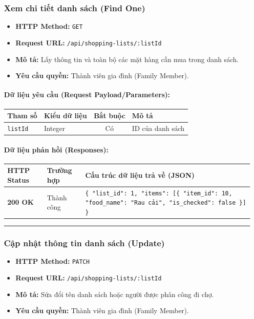\documentclass[12pt,a4paper]{article}
\begin{document}
\subsubsection{Xem chi tiết danh sách (Find One)}
\begin{itemize}[leftmargin=*]
    \item \textbf{HTTP Method:} \texttt{GET}
    \item \textbf{Request URL:} \texttt{/api/shopping-lists/:listId}
    \item \textbf{Mô tả:} Lấy thông tin và toàn bộ các mặt hàng cần mua trong danh sách.
    \item \textbf{Yêu cầu quyền:} Thành viên gia đình (Family Member).
\end{itemize}

\paragraph{Dữ liệu yêu cầu (Request Payload/Parameters):}
\begin{longtable}{|>{\raggedright\arraybackslash}p{2.8cm}|>{\raggedright\arraybackslash}p{2.2cm}|c|>{\raggedright\arraybackslash}p{7.0cm}|}
\hline
\textbf{Tham số} & \textbf{Kiểu dữ liệu} & \textbf{Bắt buộc} & \textbf{Mô tả} \\ \hline
\endhead
\texttt{listId} & Integer & Có & ID của danh sách \\ \hline
\end{longtable}

\paragraph{Dữ liệu phản hồi (Responses):}
\begin{longtable}{|>{\raggedright\arraybackslash}p{2.8cm}|>{\raggedright\arraybackslash}p{3.2cm}|>{\raggedright\arraybackslash}p{8.0cm}|}
\hline
\textbf{HTTP Status} & \textbf{Trường hợp} & \textbf{Cấu trúc dữ liệu trả về (JSON)} \\ \hline
\endhead
\textbf{200 OK} & Thành công & \texttt{\{ "list\_id": 1, "items": [\{ "item\_id": 10, "food\_name": "Rau cải", "is\_checked": false \}] \}} \\ \hline
\end{longtable}

\vskip 0.4cm
\noindent\rule{\textwidth}{0.3pt}
\vskip 0.4cm

\subsubsection{Cập nhật thông tin danh sách (Update)}
\begin{itemize}[leftmargin=*]
    \item \textbf{HTTP Method:} \texttt{PATCH}
    \item \textbf{Request URL:} \texttt{/api/shopping-lists/:listId}
    \item \textbf{Mô tả:} Sửa đổi tên danh sách hoặc người được phân công đi chợ.
    \item \textbf{Yêu cầu quyền:} Thành viên gia đình (Family Member).
\end{itemize}
\end{document}
